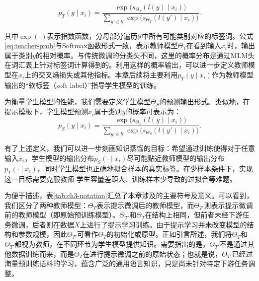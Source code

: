 \documentclass[../main.tex]{subfiles}
\begin{document}
\begin{equation}
	\label{eq:teacher-prob}
	p_{T}(y \mid x_i) = \frac{\exp\big(s_{\Theta_T}(l(y)\mid x_i)\big)}{\displaystyle\sum_{y' \in \mathcal{Y}} \exp\big(s_{\Theta_T}(l(y')\mid x_i)\big)} .
\end{equation}

\noindent 其中$\exp(\cdot)$表示指数函数，分母部分遍历$\mathcal{Y}$中所有可能类别对应的标签词。公式\eqref{eq:teacher-prob}与Softmax函数形式一致，表示教师模型$\Theta_T$在看到输入$x_i$时，输出属于类别$y$的相对概率。与传统微调的分类头不同，这里的概率分布是通过MLM头在词汇表上针对标签词计算得到的。利用这样的概率输出，可以进一步定义教师模型在$x_i$上的交叉熵损失或其他指标。本章后续将主要利用$p_T(y\mid x_i)$作为教师模型输出的“软标签（soft label）”指导学生模型的训练。

为衡量学生模型的性能，我们需要定义学生模型$\Theta_S$的预测输出形式。类似地，在提示模板下，学生模型预测$x_i$属于类别$y$的概率可表示为：
\begin{equation}
	\label{eq:student-prob}
	p_{S}(y \mid x_i) = \frac{\exp\big(s_{\Theta_S}(l(y)\mid x_i)\big)}{\displaystyle\sum_{y' \in \mathcal{Y}} \exp\big(s_{\Theta_S}(l(y')\mid x_i)\big)} .
\end{equation}

有了上述定义，我们可以进一步刻画知识蒸馏的目标：希望通过训练使得对于任意输入$x_i$，学生模型的输出分布$p_S(\cdot \mid x_i)$尽可能贴近教师模型的输出分布$p_T(\cdot \mid x_i)$，同时学生模型也正确地拟合样本的真实标签。在少样本条件下，实现这一目标需要克服教师-学生容量差距大、训练样本少导致的过拟合等难题。

为便于描述，表\ref{tab:ch3-notation}汇总了本章涉及的主要符号及意义。可以看到，我们区分了两种教师模型：$\Theta_T$表示提示微调后的教师模型，而$\Theta_{T'}$则表示提示微调前的教师模型（即原始预训练模型）。$\Theta_{T'}$和$\Theta_T$在结构上相同，但前者未经下游任务微调，后者则在数据$X$上进行了提示学习训练。由于提示学习并未改变模型的结构和参数规模，因此$\Theta_{T'}$可看作$\Theta_T$的初始化或原型。正如引言所述，我们将$\Theta_T$和$\Theta_{T'}$都视为教师，在不同环节为学生模型提供知识。需要指出的是，$\Theta_{T'}$不是通过其他数据训练而来，而是$\Theta_T$在进行提示微调之前的原始状态；也就是说，$\Theta_{T'}$已经过海量预训练语料的学习，蕴含广泛的通用语言知识，只是尚未针对特定下游任务调整。
\end{document}
